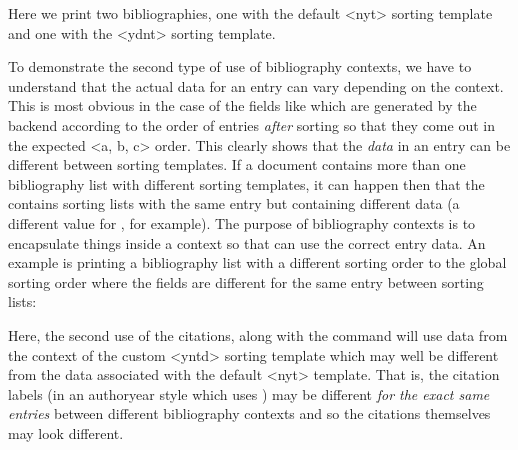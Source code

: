 \documentclass{ltxdockit}[2011/03/25]
\newcommand*{\biblatex}{\sty{biblatex}\xspace}
\begin{document}
%
Here we print two bibliographies, one with the default <nyt> sorting template and one with the <ydnt> sorting template.

To demonstrate the second type of use of bibliography contexts, we have to understand that the actual data for an entry can vary depending on the context. This is most obvious in the case of the  fields like  which are generated by the backend according to the order of entries \emph{after} sorting so that they come out in the expected <a, b, c> order. This clearly shows that the \emph{data} in an entry can be different between sorting templates. If a document contains more than one bibliography list with different sorting templates, it can happen then that the  contains sorting lists with the same entry but containing different data (a different value for , for example). The purpose of bibliography contexts is to encapsulate things inside a context so that \biblatex can use the correct entry data. An example is printing a bibliography list with a different sorting order to the global sorting order where the  fields are different for the same entry between sorting lists:

%
Here, the second use of the citations, along with the  command will use data from the context of the custom <yntd> sorting template which may well be different from the data associated with the default <nyt> template. That is, the citation labels (in an authoryear style which uses ) may be different \emph{for the exact same entries} between different bibliography contexts and so the citations themselves may look different.
\end{document}
